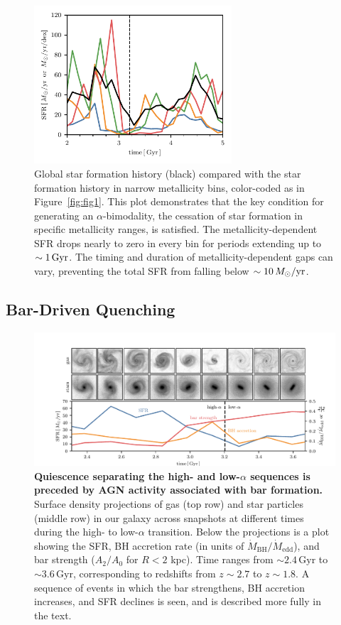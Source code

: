\begin{figure}
  \centering
  \includegraphics[width=208.14452628pt]{ch4/392276_zSFH.pdf}
  \caption{Global star formation history (black) compared with the star formation history in narrow metallicity bins, color-coded as in Figure~\ref{fig:fig1}. This plot demonstrates that the key condition for generating an $\alpha$-bimodality, the cessation of star formation in specific metallicity ranges, is satisfied. The metallicity-dependent SFR drops nearly to zero in every bin for periods extending up to $\sim1\,\textrm{Gyr}$. The timing and duration of metallicity-dependent gaps can vary, preventing the total SFR from falling below $\sim10\,M_{\odot}/\textrm{yr}$.}
  \label{fig:zSFH}
\end{figure}

\subsection{Bar-Driven Quenching}\label{ssec:sequence_of_events}
\begin{figure}
  \centering
  \includegraphics[width=\textwidth]{ch4/alyssa.pdf}
  \caption{\textbf{Quiescence separating the high- and low-$\alpha$ sequences is preceded by AGN activity associated with bar formation.} Surface density projections of gas (top row) and star particles (middle row) in our galaxy across snapshots at different times during the high- to low-$\alpha$ transition. Below the projections is a plot showing the SFR, BH accretion rate (in units of $\dot{M}_{\textrm{BH}}/\dot{M}_{\textrm{edd}}$), and bar strength ($A_2/A_0$ for $R<2$ kpc). Time ranges from $\sim2.4\,\textrm{Gyr}$ to $\sim3.6\,\textrm{Gyr}$, corresponding to redshifts from $z\sim2.7$ to $z\sim1.8$. A sequence of events in which the bar strengthens, BH accretion increases, and SFR declines is seen, and is described more fully in the text.}
  \label{fig:seq}
\end{figure}

